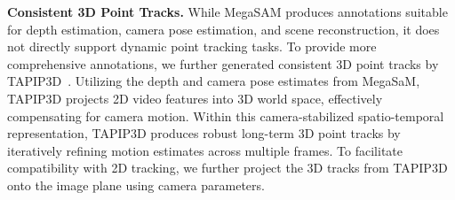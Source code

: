 \noindent\textbf{Consistent 3D Point Tracks.} While MegaSAM produces annotations suitable for depth estimation, camera pose estimation, and scene reconstruction, it does not directly support dynamic point tracking tasks. To provide more comprehensive annotations, we further generated consistent 3D point tracks by TAPIP3D~\cite{zhang2025tapip3d}. 
Utilizing the depth and camera pose estimates from MegaSaM, TAPIP3D projects 2D video features into 3D world space, effectively compensating for camera motion.
Within this camera-stabilized spatio-temporal representation, TAPIP3D produces robust long-term 3D point tracks by iteratively refining motion estimates across multiple frames.
To facilitate compatibility with 2D tracking, we further project the 3D tracks from TAPIP3D onto the image plane using camera parameters.





